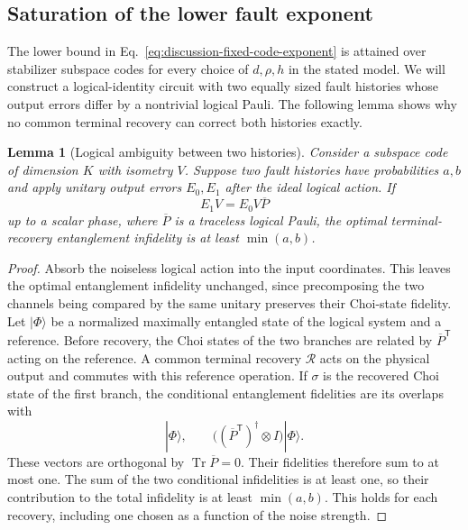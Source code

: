 \documentclass[aps,prl,reprint,notitlepage,nofootinbib,nobibnotes]{revtex4-2}
\newtheorem{lemma}{Lemma}
\newcommand{\id}{I}
\newcommand{\tr}{\operatorname{Tr}}
\begin{document}
\subsection*{Saturation of the lower fault exponent}
\label{em:lower-saturation}

The lower bound in Eq.~\eqref{eq:discussion-fixed-code-exponent} is attained over stabilizer
subspace codes for every choice of $d,\rho,h$ in the stated model. We will construct a
logical-identity circuit with two equally sized fault histories whose output errors differ by a
nontrivial logical Pauli. The following lemma shows why no common terminal recovery can correct
both histories exactly.

\begin{lemma}[Logical ambiguity between two histories]
\label{lem:two-pauli-histories}
Consider a subspace code of dimension $K$ with isometry $V$. Suppose two fault histories have
probabilities $a,b$ and apply unitary output errors $E_0,E_1$ after the ideal logical action. If
\[
 E_1V=E_0V\overline P
\]
up to a scalar phase, where $\overline P$ is a traceless logical Pauli, the optimal
terminal-recovery entanglement infidelity is at least $\min(a,b)$.
\end{lemma}

\begin{proof}
Absorb the noiseless logical action into the input coordinates. This leaves the optimal
entanglement infidelity unchanged, since precomposing the two channels being compared by the same
unitary preserves their Choi-state fidelity. Let $|\Phi\rangle$ be a normalized maximally entangled
state of the logical system and a reference. Before recovery, the Choi states of the two branches
are related by $\overline P^{\mathsf T}$ acting on the reference. A common terminal recovery
$\mathcal R$ acts on the physical output and commutes with this reference operation. If $\sigma$ is
the recovered Choi state of the first branch, the conditional entanglement fidelities are its
overlaps with
\[
 |\Phi\rangle,\qquad
 \bigl((\overline P^{\mathsf T})^\dagger\otimes\id\bigr)|\Phi\rangle.
\]
These vectors are orthogonal by $\tr\overline P=0$. Their fidelities therefore sum to at most one.
The sum of the two conditional infidelities is at least one, so their contribution to the total
infidelity is at least $\min(a,b)$. This holds for each recovery, including one chosen as a
function of the noise strength.
\end{proof}
\end{document}
